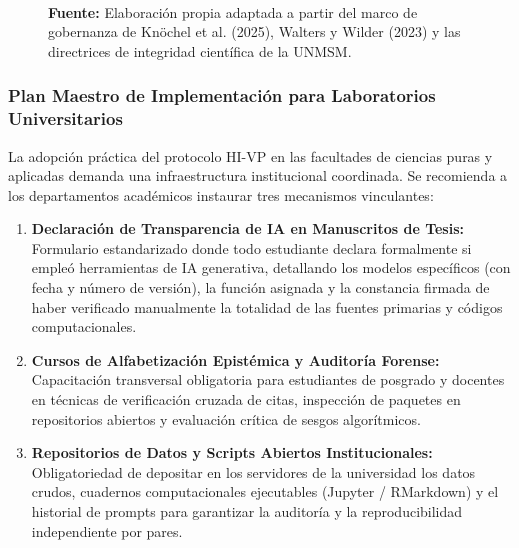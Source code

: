\begin{figure}[htpb!]
\begin{tcolorbox}[colback=white, colframe=unmsm_gold, arc=3pt, boxrule=0.8pt, top=0.3cm, bottom=0.3cm, left=0.4cm, right=0.4cm]
{%
}\\[0.25cm]
\raggedright
\scriptsize \textbf{Fuente:} Elaboración propia adaptada a partir del marco de gobernanza de Knöchel et al. (2025), Walters y Wilder (2023) y las directrices de integridad científica de la UNMSM.
\end{tcolorbox}
\vspace{0.15cm}
\end{figure}

\subsubsection{Plan Maestro de Implementación para Laboratorios Universitarios}

La adopción práctica del protocolo HI-VP en las facultades de ciencias puras y aplicadas demanda una infraestructura institucional coordinada. Se recomienda a los departamentos académicos instaurar tres mecanismos vinculantes:

\begin{enumerate}
    \item \textbf{Declaración de Transparencia de IA en Manuscritos de Tesis:} Formulario estandarizado donde todo estudiante declara formalmente si empleó herramientas de IA generativa, detallando los modelos específicos (con fecha y número de versión), la función asignada y la constancia firmada de haber verificado manualmente la totalidad de las fuentes primarias y códigos computacionales.
    \item \textbf{Cursos de Alfabetización Epistémica y Auditoría Forense:} Capacitación transversal obligatoria para estudiantes de posgrado y docentes en técnicas de verificación cruzada de citas, inspección de paquetes en repositorios abiertos y evaluación crítica de sesgos algorítmicos.
    \item \textbf{Repositorios de Datos y Scripts Abiertos Institucionales:} Obligatoriedad de depositar en los servidores de la universidad los datos crudos, cuadernos computacionales ejecutables (Jupyter / RMarkdown) y el historial de prompts para garantizar la auditoría y la reproducibilidad independiente por pares.
\end{enumerate}

